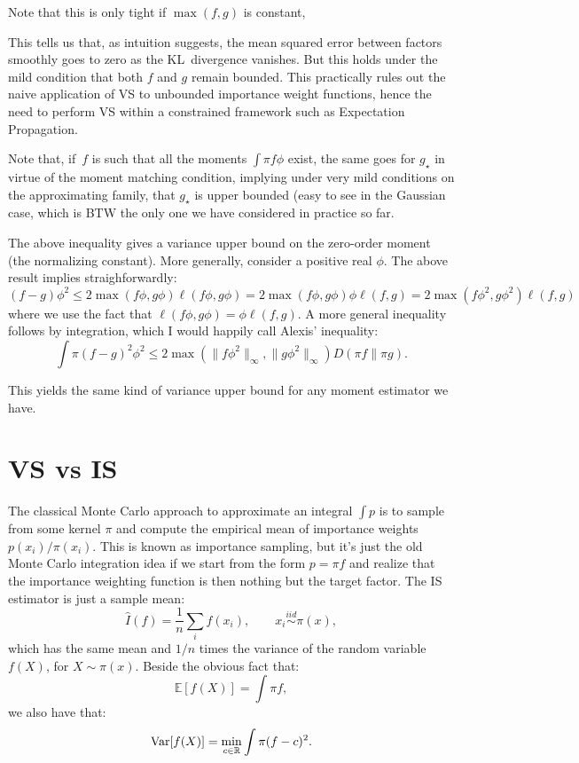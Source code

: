\documentclass{article}
\begin{document}
Note that this is only tight if $\max(f,g)$ is constant, 

This tells us that, as intuition suggests, the mean squared error between factors smoothly goes to zero as the KL~divergence vanishes. But this holds under the mild condition that both $f$ and $g$ remain bounded. This practically rules out the naive application of VS to unbounded importance weight functions, hence the need to perform VS within a constrained framework such as Expectation Propagation.

Note that, if~$f$ is such that all the moments $\int\pi f \phi$ exist, the same goes for $g_\star$ in virtue of the moment matching condition, implying under very mild conditions on the approximating family, that $g_\star$ is upper bounded (easy to see in the Gaussian case, which is BTW the only one we have considered in practice so far.

The above inequality gives a variance upper bound on the zero-order moment (the normalizing constant). More generally, consider a positive real $\phi$. The above result implies straighforwardly:
$$
(f-g)\phi^2
\leq 2 \max(f\phi, g\phi) \ell(f\phi, g\phi)
= 2 \max(f\phi, g\phi) \phi\ell(f, g)
= 2 \max(f\phi^2, g\phi^2) \ell(f, g)
$$
where we use the fact that $\ell(f\phi,g\phi)=\phi\ell(f,g)$. A more general inequality follows by integration, which I would happily call Alexis' inequality:
$$
\int \pi (f-g)^2\phi^2 \leq 2\max(\|f\phi^2\|_\infty, \|g\phi^2\|_\infty) D(\pi f\|\pi g).
$$

This yields the same kind of variance upper bound for any moment estimator we have.


\section{VS vs IS}

The classical Monte Carlo approach to approximate an integral $\int p$ is to sample from some kernel $\pi$ and compute the empirical mean of importance weights $p(x_i)/\pi(x_i)$. This is known as importance sampling, but it's just the old Monte Carlo integration idea if we start from the form $p=\pi f$ and realize that the importance weighting function is then nothing but the target factor. The IS estimator is just a sample mean:
$$
\hat{I}(f) = \frac{1}{n}\sum_i f(x_i),
\qquad x_i \stackrel{iid}{\sim} \pi(x),
$$
which has the same mean and $1/n$ times the variance of the random variable $f(X)$, for $X\sim\pi(x)$. Beside the obvious fact that:
$$
\mathbb{E}[f(X)] = \int\pi f,
$$
we also have that:
$$
{\rm Var}[f(X)]
= \min_{c\in\mathbb{R}} \int \pi (f - c)^2.
$$
\end{document}
